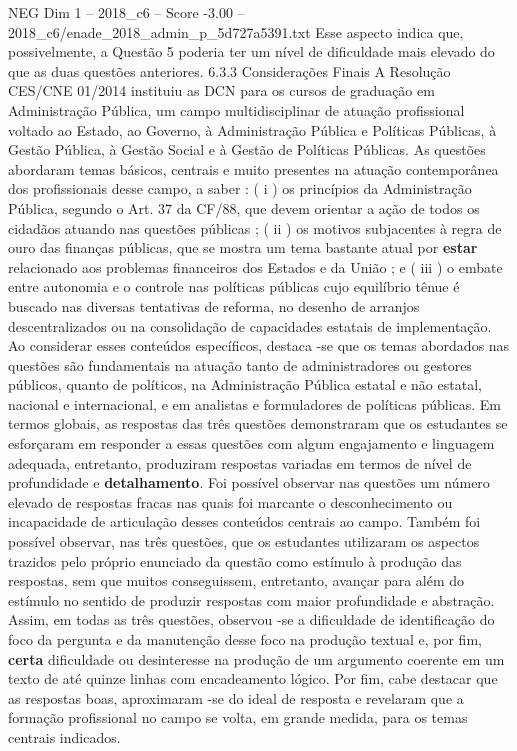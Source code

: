 \begin{textsample}{NEG Dim 1 – 2018\_c6 – Score -3.00 – 2018\_c6/enade\_2018\_admin\_p\_5d727a5391.txt}
Esse aspecto indica que, possivelmente, a Questão 5 poderia ter um nível de dificuldade mais elevado do que as duas questões anteriores. 6.3.3 Considerações Finais A Resolução CES/CNE 01/2014 instituiu as DCN para os cursos de graduação em Administração Pública, um campo multidisciplinar de atuação profissional voltado ao Estado, ao Governo, à Administração Pública e Políticas Públicas, à Gestão Pública, à Gestão Social e à Gestão de Políticas Públicas.
As questões abordaram temas básicos, centrais e muito presentes na atuação contemporânea dos profissionais desse campo, a saber : ( i ) os princípios da Administração Pública, segundo o Art. 37 da CF/88, que devem orientar a ação de todos os cidadãos atuando nas questões públicas ; ( ii ) os motivos subjacentes à regra de ouro das finanças públicas, que se mostra um tema bastante atual por \textbf{estar} relacionado aos problemas financeiros dos Estados e da União ; e ( iii ) o embate entre autonomia e o controle nas políticas públicas cujo equilíbrio tênue é buscado nas diversas tentativas de reforma, no desenho de arranjos descentralizados ou na consolidação de capacidades estatais de implementação.
Ao considerar esses conteúdos específicos, destaca -se que os temas abordados nas questões são fundamentais na atuação tanto de administradores ou gestores públicos, quanto de políticos, na Administração Pública estatal e não estatal, nacional e internacional, e em analistas e formuladores de políticas públicas.
Em termos globais, as respostas das três questões demonstraram que os estudantes se esforçaram em responder a essas questões com algum engajamento e linguagem adequada, entretanto, produziram respostas variadas em termos de nível de profundidade e \textbf{detalhamento}.
Foi possível observar nas questões um número elevado de respostas fracas nas quais foi marcante o desconhecimento ou incapacidade de articulação desses conteúdos centrais ao campo.
Também foi possível observar, nas três questões, que os estudantes utilizaram os aspectos trazidos pelo próprio enunciado da questão como estímulo à produção das respostas, sem que muitos conseguissem, entretanto, avançar para além do estímulo no sentido de produzir respostas com maior profundidade e abstração.
Assim, em todas as três questões, observou -se a dificuldade de identificação do foco da pergunta e da manutenção desse foco na produção textual e, por fim, \textbf{certa} dificuldade ou desinteresse na produção de um argumento coerente em um texto de até quinze linhas com encadeamento lógico.
Por fim, cabe destacar que as respostas boas, aproximaram -se do ideal de resposta e revelaram que a formação profissional no campo se volta, em grande medida, para os temas centrais indicados.

\end{textsample}
